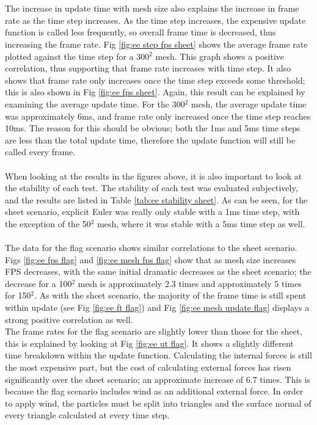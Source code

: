 \\\\The increase in update time with mesh size also explains the increase in frame rate as the time step increases. As the time step increases, the expensive update function is called less frequently, so overall frame time is decreased, thus increasing the frame rate. Fig \ref{fig:ee step fps sheet} shows the average frame rate plotted against the time step for a 300$^{2}$ mesh. This graph shows a positive correlation, thus supporting that frame rate increases with time step. It also shows that frame rate only increases once the time step exceeds some threshold; this is also shown in Fig \ref{fig:ee fps sheet}. Again, this result can be explained by examining the average update time. For the 300$^{2}$ mesh, the average update time was approximately 6ms, and frame rate only increased once the time step reaches 10ms. The reason for this should be obvious; both the 1ms and 5ms time steps are less than the total update time, therefore the update function will still be called every frame.
\\\\When looking at the results in the figures above, it is also important to look at the stability of each test. The stability of each test was evaluated subjectively, and the results are listed in Table \ref{tab:ee stability sheet}. As can be seen, for the sheet scenario, explicit Euler was really only stable with a 1ms time step, with the exception of the 50$^{2}$ mesh, where it was stable with a 5ms time step as well.
\\\\The data for the flag scenario shows similar correlations to the sheet scenario. Figs \ref{fig:ee fps flag} and \ref{fig:ee mesh fps flag} show that as mesh size increases FPS decreases, with the same initial dramatic decreases as the sheet scenario; the decrease for a 100$^{2}$ mesh is approximately 2.3 times and approximately 5 times for 150$^{2}$. As with the sheet scenario, the majority of the frame time is still spent within update (see Fig \ref{fig:ee ft flag}) and Fig \ref{fig:ee mesh update flag} displays a strong positive correlation as well.
\\The frame rates for the flag scenario are slightly lower than those for the sheet, this is explained by looking at Fig \ref{fig:ee ut flag}. It shows a slightly different time breakdown within the update function. Calculating the internal forces is still the most expensive part, but the cost of calculating external forces has risen significantly over the sheet scenario; an approximate increase of 6.7 times. This is because the flag scenario includes wind as an additional external force. In order to apply wind, the particles must be split into triangles and the surface normal of every triangle calculated at every time step. 
